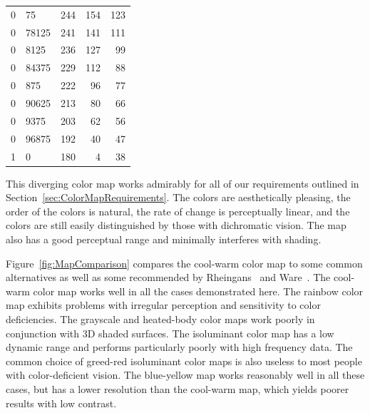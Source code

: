 \documentclass[review,journal]{vgtc}         %
\newcommand{\scite}[1]{~\cite{#1}}
\begin{document}
\begin{table}
\begin{tabular}{r@{.}l@{\qquad}rrr}
    0&75	&	244	&	154	&	123	\\
    0&78125	&	241	&	141	&	111	\\
    0&8125	&	236	&	127	&	99	\\
    0&84375	&	229	&	112	&	88	\\
    0&875	&	222	&	96	&	77	\\
    0&90625	&	213	&	80	&	66	\\
    0&9375	&	203	&	62	&	56	\\
    0&96875	&	192	&	40	&	47	\\
    1&0		&	180	&	4	&	38
  \end{tabular}
  \label{table:Cool2WarmRGB}
\end{table}

This diverging color map works admirably for all of our
requirements outlined in
Section~\ref{sec:ColorMapRequirements}.  The colors are aesthetically
pleasing, the order of the colors is natural, the rate of change is
perceptually linear, and the colors are still easily distinguished by those
with dichromatic vision.  The map also has a good perceptual range and
minimally interferes with shading.

Figure~\ref{fig:MapComparison} compares the cool-warm color map to some
common alternatives as well as some recommended by
Rheingans\scite{Rheingans99} and Ware\scite{Ware04}.  The cool-warm color
map works well in all the cases demonstrated here.  The rainbow color map
exhibits problems with irregular perception and sensitivity to color
deficiencies.  The grayscale and heated-body color maps work poorly in
conjunction with 3D shaded surfaces.  The isoluminant color map has a low
dynamic range and performs particularly poorly with high frequency data.
The common choice of greed-red isoluminant color maps is also useless to
most people with color-deficient vision.  The blue-yellow map works
reasonably well in all these cases, but has a lower resolution than the
cool-warm map, which yields poorer results with low contrast.


\end{document}
